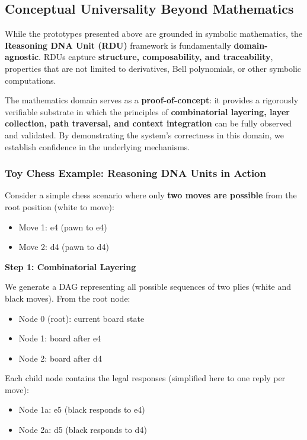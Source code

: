 \documentclass[12pt]{article}
\begin{document}
\subsection{Conceptual Universality Beyond Mathematics}

While the prototypes presented above are grounded in symbolic mathematics, the \textbf{Reasoning DNA Unit (RDU)} framework is fundamentally \textbf{domain-agnostic}. RDUs capture \textbf{structure, composability, and traceability}, properties that are not limited to derivatives, Bell polynomials, or other symbolic computations.

The mathematics domain serves as a \textbf{proof-of-concept}: it provides a rigorously verifiable substrate in which the principles of \textbf{combinatorial layering, layer collection, path traversal, and context integration} can be fully observed and validated. By demonstrating the system’s correctness in this domain, we establish confidence in the underlying mechanisms.

\subsubsection*{Toy Chess Example: Reasoning DNA Units in Action}

Consider a simple chess scenario where only \textbf{two moves are possible} from the root position (white to move):  

\begin{itemize}
    \item Move 1: e4 (pawn to e4)  
    \item Move 2: d4 (pawn to d4)  
\end{itemize}

\textbf{Step 1: Combinatorial Layering}  

We generate a DAG representing all possible sequences of two plies (white and black moves). From the root node:

\begin{itemize}
    \item Node 0 (root): current board state  
    \item Node 1: board after e4  
    \item Node 2: board after d4  
\end{itemize}

Each child node contains the legal responses (simplified here to one reply per move):

\begin{itemize}
    \item Node 1a: e5 (black responds to e4)  
    \item Node 2a: d5 (black responds to d4)  
\end{itemize}
\end{document}
